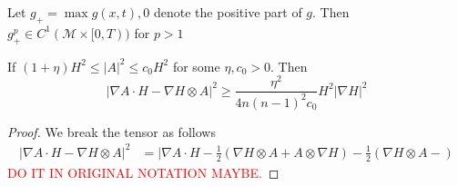 \begin{comment}
    Also, \begin{align*}
        \nabla g & = \nabla \left[ (|A|^{2}- (1+\eta)H^{2})H^{\sigma -2}\right] \\
        & = (\nabla|A|^{2}- 2(1+\eta)H\nabla H)H^{\sigma -2} + (\sigma -2)(|A|^{2}- (1+\eta)H^{2})H^{\sigma -3}\nabla H \\
        & = (\nabla|A|^{2})H^{\sigma -2} + (\sigma -2)|A|^{2}H^{\sigma -3}\nabla H - \sigma(1+\eta)H^{\sigma -1}\nabla H
    \end{align*}
    which implies \begin{align*}
        \left< \nabla H, \nabla g \right>& = \left< \nabla |A|^{2}, \nabla H \right>H^{\sigma -2} + (\sigma -2)|A|^{2}|\nabla H|^{2}H^{\sigma -3} - \sigma (1+ \eta)|\nabla H|^{2}H^{\sigma -1}
    \end{align*}
\end{proof}
\end{comment}

Let $ g_{+}= \max{g(x,t),0} $ denote the positive part of $ g $. Then $ g_{+}^{p} \in C^{1}( \mathcal{M} \times [0,T)) $ for $ p>1 $
 

    

\begin{lemma}
    If $ (1+\eta)H^{2} \le |A|^{2} \le c_{0}H^{2} $ for some $ \eta, c_{0} >0 $. Then 
    \[ |\nabla A \cdot H - \nabla H \otimes A|^{2} \ge \frac{\eta^{2}}{4n(n-1)^{2}c_{0}}H^{2}|\nabla H|^{2} \]
\end{lemma}
\begin{proof}
    We break the tensor as follows \begin{align*}
        | \nabla A \cdot H - \nabla H \otimes A|^{2} & = | \nabla A \cdot H - \frac{1}{2}\left( \nabla H \otimes A + A \otimes \nabla H  \right) - \frac{1}{2}\left( \nabla H \otimes A -  \right)
    \end{align*}
    \textcolor{red}{DO IT IN ORIGINAL NOTATION MAYBE.}
\end{proof}

